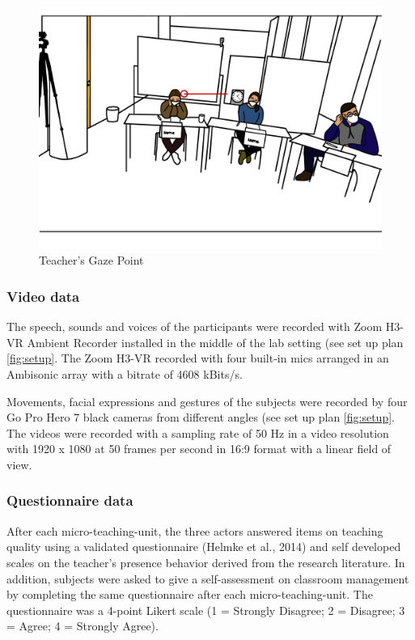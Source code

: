 \documentclass[
  man]{apa6}
\begin{document}
\begin{figure}

{\centering \includegraphics{./pictures/teachersgaze} 

}

\caption{Teacher's Gaze Point}\label{fig:teachersgaze}
\end{figure}

\hypertarget{video-data}{%
\subsubsection{Video data}\label{video-data}}

The speech, sounds and voices of the participants were recorded with Zoom H3-VR Ambient Recorder installed in the middle of the lab setting (see set up plan \ref{fig:setup}. The Zoom H3-VR recorded with four built-in mics arranged in an Ambisonic array with a bitrate of 4608 kBits/s.

Movements, facial expressions and gestures of the subjects were recorded by four Go Pro Hero 7 black cameras from different angles (see set up plan \ref{fig:setup}. The videos were recorded with a sampling rate of 50 Hz in a video resolution with 1920 x 1080 at 50 frames per second in 16:9 format with a linear field of view.

\hypertarget{questionnaire-data}{%
\subsubsection{Questionnaire data}\label{questionnaire-data}}

After each micro-teaching-unit, the three actors answered items on teaching quality using a validated questionnaire (Helmke et al., 2014) and self developed scales on the teacher's presence behavior derived from the research literature. In addition, subjects were asked to give a self-assessment on classroom management by completing the same questionnaire after each micro-teaching-unit. The questionnaire was a 4-point Likert scale (1 = Strongly Disagree; 2 = Disagree; 3 = Agree; 4 = Strongly Agree).
\end{document}
